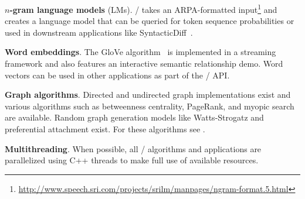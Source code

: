 \textbf{$n$-gram language models} (LMs).
\meta/ takes an ARPA-formatted
input\footnote{\url{http://www.speech.sri.com/projects/srilm/manpages/ngram-format.5.html}}
and creates a language model that can be queried for token sequence
probabilities or used in downstream applications like
SyntacticDiff~\citep{syndiff}.

\textbf{Word embeddings}.
The GloVe algorithm~\citep{glove} is implemented in a streaming framework and
also features an interactive semantic relationship demo. Word vectors can be
used in other applications as part of the \meta/ API\@.

\textbf{Graph algorithms}.
Directed and undirected graph implementations exist and various algorithms such
as betweenness centrality, PageRank, and myopic search are available. Random
graph generation models like Watts-Strogatz and preferential attachment exist.
For these algorithms see \citet{networks}.

\textbf{Multithreading}.
When possible, all \meta/ algorithms and applications are parallelized using C++
threads to make full use of available resources.

